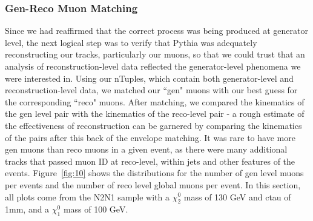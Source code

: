 \documentclass{article}
\begin{document}
\subsubsection{Gen-Reco Muon Matching}
Since we had reaffirmed that the correct process was being produced at generator level, the next logical step was to verify that Pythia was adequately reconstructing our tracks, particularly our muons, so that we could trust that an analysis of reconstruction-level data reflected the generator-level phenomena we were interested in. Using our nTuples, which contain both generator-level and reconstruction-level data, we matched our ``gen" muons with our best guess for the corresponding ``reco" muons. After matching, we compared the kinematics of the gen level pair with the kinematics of the reco-level pair - a rough estimate of the effectiveness of reconstruction can be garnered by comparing the kinematics of the pairs after this back of the envelope matching. It was rare to have more gen muons than reco muons in a given event, as there were many additional tracks that passed muon ID at reco-level, within jets and other features of the events. Figure~\ref{fig:10} shows the distributions for the number of gen level muons per events and the number of reco level global muons per event. In this section, all plots come from the N2N1 sample with a $\chi_{2}^{0}$ mass of 130 GeV and ctau of 1mm, and a $\chi_{1}^{0}$ mass of 100 GeV.
\par
\end{document}
